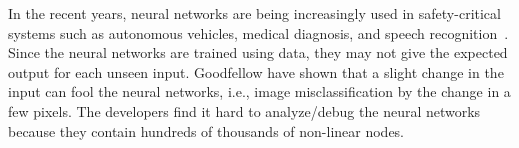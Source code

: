 









In the recent years, neural networks are being increasingly used in
safety-critical systems such as autonomous vehicles,
medical diagnosis, and speech recognition~\cite{bojarski2016end,amato2013artificial,hinton2012deep}. Since the neural networks are trained using data, they may not give the expected output for each unseen input. Goodfellow \cite{goodfellow2014explaining} have shown that a slight change in the input can fool the neural networks, i.e., image misclassification by the change in a few pixels.  The developers find it hard to analyze/debug the neural networks because they contain hundreds of thousands of non-linear nodes.


